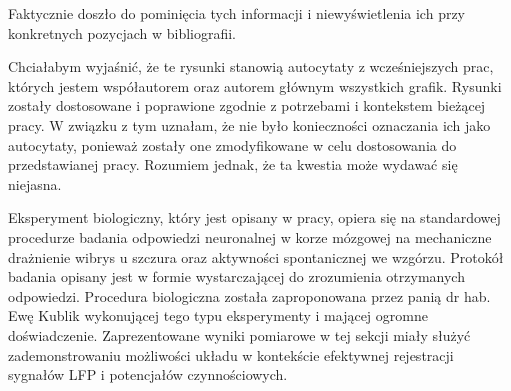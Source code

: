 \begin{frame}[t]
    \begin{block}{\tb}
    \end{block}

    Faktycznie doszło do pominięcia tych informacji i niewyświetlenia ich przy konkretnych pozycjach w bibliografii.

    \begin{block}{\tb}
    \end{block}
    Chciałabym wyjaśnić, że te rysunki stanowią autocytaty z wcześniejszych prac, których jestem współautorem oraz autorem głównym wszystkich grafik. 
    Rysunki zostały dostosowane i poprawione zgodnie z potrzebami i kontekstem bieżącej pracy. 
    W związku z tym uznałam, że nie było konieczności oznaczania ich jako autocytaty, ponieważ zostały one zmodyfikowane w celu dostosowania do przedstawianej pracy. 
    Rozumiem jednak, że ta kwestia może wydawać się niejasna.
\end{frame}
  
\begin{frame}[t]

    \begin{block}{\tb}
    \end{block}
    Eksperyment biologiczny, który jest opisany w pracy, opiera się na standardowej procedurze badania odpowiedzi neuronalnej w korze mózgowej na mechaniczne drażnienie wibrys u szczura oraz aktywności spontanicznej we wzgórzu.
    Protokół badania opisany jest w formie  wystarczającej do zrozumienia otrzymanych odpowiedzi.
    Procedura biologiczna została zaproponowana przez panią dr hab. Ewę Kublik wykonującej tego typu eksperymenty i mającej ogromne doświadczenie.
    Zaprezentowane wyniki pomiarowe w tej sekcji miały służyć zademonstrowaniu możliwości układu w kontekście efektywnej rejestracji sygnałów LFP i potencjałów czynnościowych.
\end{frame}

